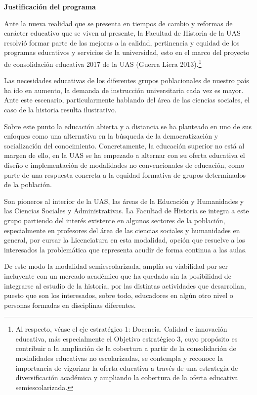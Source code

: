 \medskip
{\bfseries Justificación del programa}

Ante la nueva realidad que se presenta en tiempos de cambio y reformas 
de carácter educativo que se viven al presente, la Facultad de Historia 
de la UAS resolvió formar parte de las mejoras a la calidad, 
pertinencia y equidad de los programas educativos y servicios de la 
universidad, esto en el marco del proyecto de consolidación educativa 2017 
de la UAS (Guerra Liera 2013).\footnote{Al respecto, véase el eje estratégico 1: Docencia. Calidad e innovación educativa, más especialmente el Objetivo estratégico 3, cuyo 
propósito es contribuir a la ampliación de la cobertura a partir de la 
consolidación de modalidades educativas no escolarizadas, se contempla 
y reconoce la importancia de vigorizar la oferta educativa a través de 
una estrategia de diversificación académica y ampliando la cobertura de 
la oferta educativa semiescolarizada.}

Las necesidades educativas de los diferentes grupos poblacionales de 
nuestro país ha ido en aumento, la demanda de instrucción universitaria 
cada vez es mayor. Ante este escenario, particularmente hablando del 
área de las ciencias sociales, el caso de la historia resulta 
ilustrativo.

Sobre este punto la educación abierta y a distancia se ha planteado en 
uno de sus enfoques como una alternativa en la búsqueda de la 
democratización y socialización del conocimiento. Concretamente, la 
educación superior no está al margen de ello, en la UAS se ha empezado 
a alternar con su oferta educativa el diseño e implementación de 
modalidades no convencionales de educación, como parte de una respuesta 
concreta a la equidad formativa de grupos determinados de la población.

Son pioneros al interior de la UAS, las áreas de la 
Educación y Humanidades y las Ciencias Sociales y 
Administrativas. La Facultad de Historia se integra a este grupo 
partiendo del interés existente en algunos sectores 
de la población, especialmente en profesores del área de las ciencias 
sociales y humanidades en general, por cursar la Licenciatura en esta 
modalidad, opción que resuelve a los interesados la problemática que 
representa acudir de forma continua a las aulas.

De este modo la modalidad semiescolarizada, amplía su 
viabilidad por ser incluyente con un mercado académico que ha quedado 
sin la posibilidad de integrarse al estudio de la historia, por las 
distintas actividades que desarrollan, puesto que son los interesados, 
sobre todo, educadores en algún otro nivel o personas formadas en 
disciplinas diferentes. 


